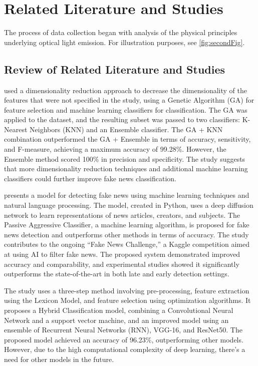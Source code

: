 
\chapter{Related Literature and Studies}
\begin{refsection}

The process of data collection began with analysis of the physical principles underlying optical light emission. For illustration purposes, see \ref{fig:secondFig}.

\section{Review of Related Literature and Studies}


 used a dimensionality reduction approach to decrease the dimensionality of the features that were not specified in the study, using a Genetic Algorithm (GA) for feature selection and machine learning classifiers for classification. The GA was applied to the dataset, and the resulting subset was passed to two classifiers: K-Nearest Neighbors (KNN) and an Ensemble classifier. The GA + KNN combination outperformed the GA + Ensemble in terms of accuracy, sensitivity, and F-measure, achieving a maximum accuracy of 99.28\%. However, the Ensemble method scored 100\% in precision and specificity. The study suggests that more dimensionality reduction techniques and additional machine learning classifiers could further improve fake news classification.

presents a model for detecting fake news using machine learning techniques and natural language processing. The model, created in Python, uses a deep diffusion network to learn representations of news articles, creators, and subjects. The Passive Aggressive Classifier, a machine learning algorithm, is proposed for fake news detection and outperforms other methods in terms of accuracy. The study contributes to the ongoing “Fake News Challenge,” a Kaggle competition aimed at using AI to filter fake news. The proposed system demonstrated improved accuracy and comparability, and experimental studies showed it significantly outperforms the state-of-the-art in both late and early detection settings.

The study uses a three-step method involving pre-processing, feature extraction using the Lexicon Model, and feature selection using optimization algorithms. It proposes a Hybrid Classification model, combining a Convolutional Neural Network and a support vector machine, and an improved model using an ensemble of Recurrent Neural Networks (RNN), VGG-16, and ResNet50. The proposed model achieved an accuracy of 96.23\%, outperforming other models. However, due to the high computational complexity of deep learning, there’s a need for other models in the future.


\end{refsection}
